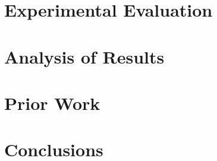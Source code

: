 \documentclass[12pt,letterpaper]{article}
\begin{document}
\section{Experimental Evaluation} \label{sec:evaluation}

\section{Analysis of Results} \label{sec:results}

\section{Prior Work} \label{sec:prior_work}

\section{Conclusions} \label{sec:conclusions}






{
\singlespacing
{\small


}
}
\end{document}
